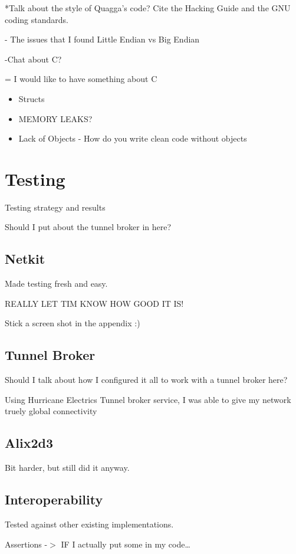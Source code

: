 \documentclass[12pt]{report}
\begin{document}
*Talk about the style of Quagga's code?
Cite the Hacking Guide and the GNU coding standards.

- The issues that I found
    Little Endian vs Big Endian
    
-Chat about C?

= I would like to have something about C

\begin{itemize}
  \item Structs
  \item MEMORY LEAKS?
  \item Lack of Objects - How do you write clean code without objects
\end{itemize}

\chapter{Testing}
Testing strategy and results

Should I put about the tunnel broker in here?

\section{Netkit} 
Made testing fresh and easy. 

REALLY LET TIM KNOW HOW GOOD IT IS!

Stick a screen shot in the appendix :)

\section{Tunnel Broker}
Should I talk about how I configured it all to work with a tunnel broker here?

Using Hurricane Electrics Tunnel broker service, I was able to give my network
truely global connectivity

\section{Alix2d3}
Bit harder, but still did it anyway.

\section{Interoperability}

Tested against other existing implementations.

Assertions -$>$ IF I actually put some in my code\ldots
\end{document}
